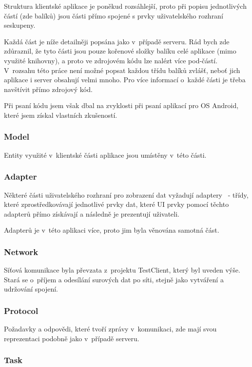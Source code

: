 \documentclass[thesis=B,czech]{FITthesis}[2013/10/20]
\begin{document}
Struktura klientské aplikace je poněkud rozsáhlejší, proto při popisu jednotlivých částí (zde balíků) jsou části přímo spojené s prvky uživatelského rozhraní seskupeny.

Každá část je níže detailněji popsána jako v~případě serveru. Rád bych zde zdůraznil, že tyto části jsou pouze kořenové složky balíku celé aplikace (mimo využité knihovny), a proto ve zdrojovém kódu lze nalézt více pod-částí. V~rozsahu této práce není možné popsat každou třídu balíků zvlášť, neboť jich aplikace i server obsahují velmi mnoho. Pro více informací o~každé části je třeba navštívit přímo zdrojový kód.

Při psaní kódu jsem však dbal na zvyklosti při psaní aplikací pro OS Android, které jsem získal vlastních zkušeností.

\subsubsection{Model}

Entity využité v~klientské části aplikace jsou umístěny v~této části.

\subsubsection{Adapter}

Některé části uživatelského rozhraní pro zobrazení dat vyžadují adaptery~\cite{adapter} - třídy, které zprostředkovávají jednotlivé prvky dat, které UI prvky pomocí těchto adapterů přímo získávají a následně je prezentují uživateli. 

Adapterů je v~této aplikaci více, proto jim byla věnována samotná část.

\subsubsection{Network}

Síťová komunikace byla převzata z~projektu TestClient, který byl uveden výše. Stará se o~příjem a odesílání surových dat po síti, stejně jako vytváření a udržování spojení.

\subsubsection{Protocol}

Požadavky a odpovědi, které tvoří zprávy v~komunikaci, zde mají svou reprezentaci podobně jako v~případě serveru.

\subsubsection{Task}
\end{document}
